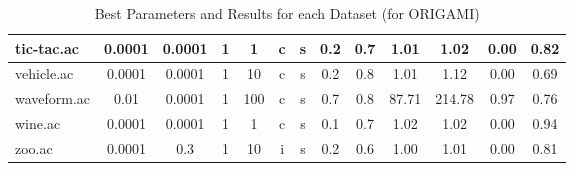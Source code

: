 \begin{table}[htbp]
\begin{tabular}{|l|c|c|c|c|c|c|c|c||c|c|c|c|}
		\hline
		tic-tac.ac     & 0.0001   & 0.0001      & 1              & 1        & c                   & s        & 0.2    & 0.7   & 1.01           & 1.02           & 0.00           & 0.82           \\
		\hline
		vehicle.ac     & 0.0001   & 0.0001      & 1              & 10       & c                   & s        & 0.2    & 0.8   & 1.01           & 1.12           & 0.00           & 0.69           \\
		\hline
		waveform.ac    & 0.01     & 0.0001      & 1              & 100      & c                   & s        & 0.7    & 0.8   & 87.71          & 214.78         & 0.97           & 0.76           \\
		\hline
		wine.ac        & 0.0001   & 0.0001      & 1              & 1        & c                   & s        & 0.1    & 0.7   & 1.02           & 1.02           & 0.00           & 0.94           \\
		\hline
		zoo.ac         & 0.0001   & 0.3         & 1              & 10       & i                   & s        & 0.2    & 0.6   & 1.00           & 1.01           & 0.00           & 0.81           \\
		\hline
		\end{tabular}
	\caption{Best Parameters and Results for each Dataset (for ORIGAMI)}
	\label{tab:best_runs_for_each_db_origami}
\end{table}